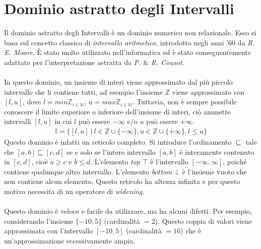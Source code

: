 \documentclass[a4paper, 10pt]{report}
\begin{document}
\chapter*{Dominio astratto degli Intervalli}
Il dominio astratto degli Intervalli è un dominio numerico non relazionale. Esso si basa sul concetto classico di \textit{intervallo aritmetico}, introdotto negli anni '60 da \textit{R. E. Moore}. È stato molto utilizzato nell'informatica ed è stato conseguentemente adattato per l'interpretazione astratta da \textit{P.} \& \textit{R. Cousot}.
\\\\
In questo dominio, un insieme di interi viene approssimato dal più piccolo intervallo che li contiene tutti, ad esempio l'insieme $\mathbb{Z}$ viene approssimato con $[l, u]$, dove $l=min \mathbb{Z}_{i\in\mathbb{N}}$, $u=max \mathbb{Z}_{i\in\mathbb{N}}$. Tuttavia, non è sempre possibile conoscere il limite superiore o inferiore dell'insieme di interi, ciò ammette intervalli $[l, u]$ in cui $l$ può essere $-\infty$ e/o $u$ può essere $+\infty$.
\begin{align*}
	\mathbb{I} = \{ [l, u] ~|~ l\in \mathbb{Z} \cup \{ -\infty \}, u\in \mathbb{Z} \cup \{ + \infty \}, l\leq u \}
\end{align*}
Questo dominio è infatti un reticolo completo. Si introduce l'ordinamento $\sqsubseteq$ tale che $[a, b] \sqsubseteq [c, d]$ se e solo se l'intero intervallo $[a, b]$ è interamente contenuto in $[c, d]$, cioè $a\geq c$ e $b\leq d$. L'elemento \textit{top} $\top$ è l'intervallo $[-\infty, \infty]$, poiché contiene qualunque altro intervallo. L'elemento \textit{bottom} $\bot$ è l'insieme vuoto che non contiene alcun elemento. Questo reticolo ha altezza infinita e per questo motivo necessita di un operatore di \textit{widening}.
\\\\
Questo dominio è veloce e facile da utilizzare, ma ha alcuni difetti. Per esempio, considerando l'insieme $\{-10, 5\}$ (cardinalità $= 2$). Questo coppia di valori viene approssimata con l'intervallo $[-10, 5]$ (cardinalità $= 16$) che è un'approssimazione eccessivamente ampia.
\end{document}
